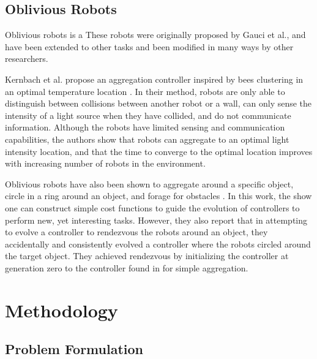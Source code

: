 \documentclass[conference]{IEEEtran}
\begin{document}
  \subsection{Oblivious Robots}

    Oblivious robots is a These robots were originally proposed by Gauci et al., and have been extended to other tasks and been modified in many ways by other researchers.

    Kernbach et al. propose an aggregation controller inspired by bees clustering in an optimal temperature location \cite{kernbach_re-embodiment_2009}. In their method, robots are only able to distinguish between collisions between another robot or a wall, can only sense the intensity of a light source when they have collided, and do not communicate information. Although the robots have limited sensing and communication capabilities, the authors show that robots can aggregate to an optimal light intensity location, and that the time to converge to the optimal location improves with increasing number of robots in the environment.

    Oblivious robots have also been shown to aggregate around a specific object, circle in a ring around an object, and forage for obstacles \cite{johnson_evolving_2016}. In this work, the show one can construct simple cost functions to guide the evolution of controllers to perform new, yet interesting tasks. However, they also report that in attempting to evolve a controller to rendezvous the robots around an object, they accidentally and consistently evolved a controller where the robots circled around the target object. They achieved rendezvous by initializing the controller at generation zero to the controller found in \cite{gauci_self-organized_2014} for simple aggregation.

\section{Methodology}

  \subsection{Problem Formulation}
\end{document}
